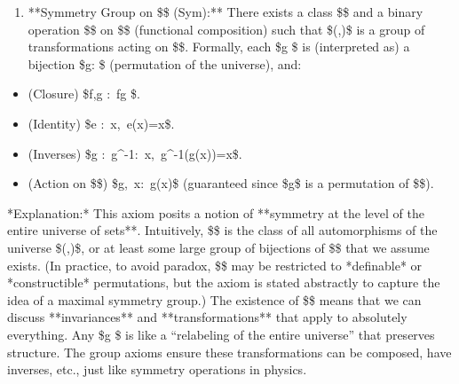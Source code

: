 \documentclass[11pt]{article}
\begin{document}
\begin{enumerate}
  \item **Symmetry Group on \$\infty\$ (Sym):** There exists a class \$\Sym\$ and a binary operation \$\circ\$ on \$\Sym\$ (functional composition) such that \$(\Sym,\circ)\$ is a group of transformations acting on \$\infty\$. Formally, each \$g \in \Sym\$ is (interpreted as) a bijection \$g: \infty \to \infty\$ (permutation of the universe), and:
\end{enumerate}

\begin{itemize}
  \item (Closure) \$\forall f,g \in \Sym:\ f\circ g \in \Sym\$.
  \item (Identity) \$\exists e \in \Sym:\ \forall x\in \infty,\ e(x)=x\$.
  \item (Inverses) \$\forall g \in \Sym:\ \exists g^{-1}\in \Sym:\ \forall x,\ g^{-1}(g(x))=x\$.
  \item (Action on \$\infty\$) \$\forall g\in\Sym,\ \forall x\in \infty:\ g(x)\in \infty\$ (guaranteed since \$g\$ is a permutation of \$\infty\$).

\end{itemize}
    *Explanation:* This axiom posits a notion of **symmetry at the level of the entire universe of sets**. Intuitively, \$\Sym\$ is the class of all automorphisms of the universe \$(\infty,\in)\$, or at least some large group of bijections of \$\infty\$ that we assume exists. (In practice, to avoid paradox, \$\Sym\$ may be restricted to *definable* or *constructible* permutations, but the axiom is stated abstractly to capture the idea of a maximal symmetry group.) The existence of \$\Sym\$ means that we can discuss **invariances** and **transformations** that apply to absolutely everything. Any \$g \in \Sym\$ is like a “relabeling of the entire universe” that preserves structure. The group axioms ensure these transformations can be composed, have inverses, etc., just like symmetry operations in physics.
\end{document}
